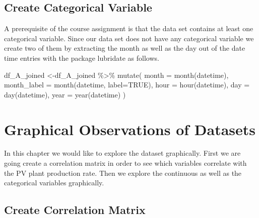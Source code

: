\documentclass[
]{article}
\newenvironment{Shaded}{\begin{snugshade}}{\end{snugshade}}
\newcommand{\AttributeTok}[1]{\textcolor[rgb]{0.77,0.63,0.00}{#1}}
\newcommand{\CommentTok}[1]{\textcolor[rgb]{0.56,0.35,0.01}{\textit{#1}}}
\newcommand{\ConstantTok}[1]{\textcolor[rgb]{0.00,0.00,0.00}{#1}}
\newcommand{\DecValTok}[1]{\textcolor[rgb]{0.00,0.00,0.81}{#1}}
\newcommand{\FunctionTok}[1]{\textcolor[rgb]{0.00,0.00,0.00}{#1}}
\newcommand{\NormalTok}[1]{#1}
\newcommand{\OtherTok}[1]{\textcolor[rgb]{0.56,0.35,0.01}{#1}}
\newcommand{\SpecialCharTok}[1]{\textcolor[rgb]{0.00,0.00,0.00}{#1}}
\begin{document}
\hypertarget{create-categorical-variable}{%
\subsection{Create Categorical
Variable}\label{create-categorical-variable}}

A prerequisite of the course assignment is that the data set contains at
least one categorical variable. Since our data set does not have any
categorical variable we create two of them by extracting the month as
well as the day out of the date time entries with the package lubridate
as follows.

\begin{Shaded}
\begin{Highlighting}[]
\NormalTok{df\_A\_joined }\OtherTok{\textless{}{-}}\NormalTok{df\_A\_joined }\SpecialCharTok{\%\textgreater{}\%}
 \FunctionTok{mutate}\NormalTok{(}
  \AttributeTok{month =} \FunctionTok{month}\NormalTok{(datetime),}
  \AttributeTok{month\_label =} \FunctionTok{month}\NormalTok{(datetime, }\AttributeTok{label=}\ConstantTok{TRUE}\NormalTok{),}
  \AttributeTok{hour =} \FunctionTok{hour}\NormalTok{(datetime),}
  \AttributeTok{day =} \FunctionTok{day}\NormalTok{(datetime),}
  \AttributeTok{year =} \FunctionTok{year}\NormalTok{(datetime)}
\NormalTok{ )}
\end{Highlighting}
\end{Shaded}

\hypertarget{graphical-observations-of-datasets}{%
\section{Graphical Observations of
Datasets}\label{graphical-observations-of-datasets}}

In this chapter we would like to explore the dataset graphically. First
we are going create a correlation matrix in order to see which variables
correlate with the PV plant production rate. Then we explore the
continuous as well as the categorical variables graphically.

\hypertarget{create-correlation-matrix}{%
\subsection{Create Correlation Matrix}\label{create-correlation-matrix}}

\begin{Shaded}
\end{Shaded}
\end{document}
